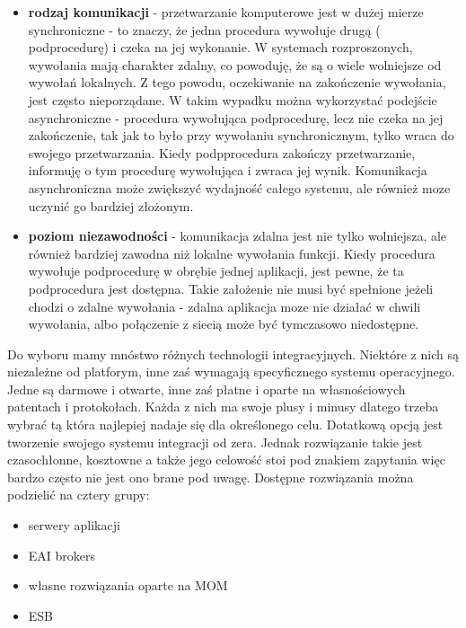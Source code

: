 \begin{itemize}
	\item \textbf{rodzaj komunikacji} - przetwarzanie komputerowe jest w dużej mierze synchroniczne - to znaczy, że jedna procedura wywołuje drugą ( podprocedurę) i czeka na jej wykonanie. W systemach rozproszonych, wywołania mają charakter zdalny, co powoduję, że są o wiele wolniejsze od wywołań lokalnych. Z tego powodu, oczekiwanie na zakończenie wywołania, jest często nieporządane. W takim wypadku można wykorzystać podejście asynchroniczne - procedura wywołująca podprocedurę, lecz nie czeka na jej zakończenie, tak jak to było przy wywołaniu synchronicznym, tylko wraca do swojego przetwarzania. Kiedy podpprocedura zakończy przetwarzanie, informuję o tym procedurę wywołująca i zwraca jej wynik. Komunikacja asynchroniczna może zwiększyć wydajność całego systemu, ale również moze uczynić go bardziej złożonym.
	\item \textbf{poziom niezawodności} - komunikacja zdalna jest nie tylko wolniejsza, ale również bardziej zawodna niż lokalne wywołania funkcji. Kiedy procedura wywołuje podprocedurę w obrębie jednej aplikacji, jest pewne, że ta podprocedura jest dostępna. Takie założenie nie musi być spełnione jeżeli chodzi o zdalne wywołania - zdalna aplikacja moze nie działać w chwili wywołania, albo połączenie z siecią może być tymczasowo niedostępne.
\end{itemize}

Do wyboru mamy mnóstwo różnych technologii integracyjnych. Niektóre z nich są niezależne od platforym, inne zaś wymagają specyficznego systemu operacyjnego. Jedne są darmowe i otwarte, inne zaś płatne i oparte na własnościowych patentach i protokołach. Każda z nich ma swoje plusy i minusy dlatego trzeba wybrać tą która najlepiej nadaje się dla określonego celu. Dotatkową opcją jest tworzenie swojego systemu integracji od zera. Jednak rozwiązanie takie jest czasochłonne, kosztowne a także jego celowość stoi pod znakiem zapytania więc bardzo często nie jest ono brane pod uwagę.
Dostępne rozwiązania można podzielić na cztery grupy: \cite{chappell2004}

\begin{itemize}
	\item serwery aplikacji
	\item EAI brokers
	\item własne rozwiązania oparte na  MOM
	\item ESB
\end{itemize}

